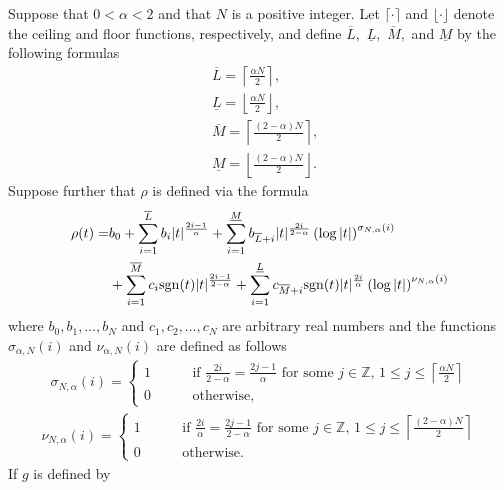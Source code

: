 \begin{theorem}\label{thm_cord}
Suppose that $0<\alpha<2$ and that $N$ is a positive integer. Let 
$\lceil \cdot \rceil$ and $\lfloor \cdot \rfloor$ denote the ceiling and floor functions,
respectively, and define $\overline{L},$ $\underline{L},$ $\overline{M},$ and 
$\underline{M}$ by the following formulas
\begin{align}
&\overline{L} = \left\lceil\frac{\alpha N}{2} \right \rceil, \\
&\underline{L} = \left\lfloor\frac{\alpha N}{2} \right \rfloor,\\
&\overline{M} = \left\lceil\frac{(2-\alpha) N}{2} \right \rceil, \\
&\underline{M} = \left\lfloor\frac{(2-\alpha) N}{2} \right \rfloor.
\end{align}
Suppose further that $\rho$ is defined via the formula
\begin{align}
\rho(t) =& b_0+\sum_{i=1}^{\overline{L}} b_i |t|^{\frac{2i-1}{\alpha}}+\sum_{i=1}^{\underline{M}} b_{\overline{L}+i} |t|^\frac{2i}{2-\alpha}\left(\log|t|\right)^{\sigma_{N,\alpha}(i)}\nonumber\\
&+\sum_{i=1}^{\overline{M}}c_i {\rm sgn}(t) |t|^\frac{2i-1}{2-\alpha}+\sum_{i=1}^{\underline{L}}c_{\overline{M}+i} {\rm sgn}(t) |t|^\frac{2i}{\alpha}\left(\log|t|\right)^{\nu_{N,\alpha}(i)}\label{eqn_rhfm}
\end{align}
where $b_0,b_1,\dots,b_N$ and $c_1,c_2,\dots,c_N$ are arbitrary real numbers and the functions $\sigma_{\alpha,N}(i)$ and $\nu_{\alpha,N}(i)$ are defined as follows
\begin{align}
\sigma_{N,\alpha}(i) = \begin{cases}
1 \quad\quad & \,\text{if}\,\, \frac{2i}{2-\alpha} = \frac{2j-1}{\alpha}\,\,\text{for some}\,\, j \in \mathbb{Z},\, 1\le j \le \left\lceil \frac{\alpha N}{2} \right\rceil\\
0 \quad\quad & \,\text{otherwise},
\end{cases}
\end{align}
\begin{align}
\nu_{N,\alpha}(i) = \begin{cases}
1 \quad\quad & \,\text{if}\,\, \frac{2i}{\alpha} = \frac{2j-1}{2-\alpha}\,\,\text{for some}\,\, j \in \mathbb{Z},\, 1\le j \le \left\lceil \frac{(2-\alpha) N}{2} \right\rceil\\
0 \quad\quad & \,\text{otherwise}.
\end{cases}
\end{align}
\noindent If $g$ is defined by

\end{theorem}
